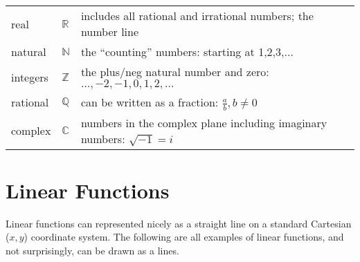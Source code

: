 \begin{table}[h]
	\centering
	\begin{tabular}{@{}lll@{}}
		\toprule
		real     &$\mathbb{R}$& includes all rational and irrational numbers; the number line             \\
		natural  &$\mathbb{N}$  & the ``counting'' numbers: starting at 1,2,3,$\dots$             \\
		integers & $\mathbb{Z}$ & the plus/neg natural number and zero: $\dots, -2,-1,0,1,2,\dots$ \\
		rational & $\mathbb{Q}$ & can be written as a fraction: $\frac{a}{b}, b\neq 0$\\
		complex  & $\mathbb{C}$ & numbers in the complex plane including imaginary numbers: $\sqrt{-1}=i$ \\ \bottomrule
	\end{tabular}
\end{table}


\section*{Linear Functions}\label{sec:linearFunction}
Linear functions can represented nicely as a straight line on a standard Cartesian ($x,y$) coordinate system. The following are all examples of linear functions, and not surprisingly, can be drawn as a lines.

